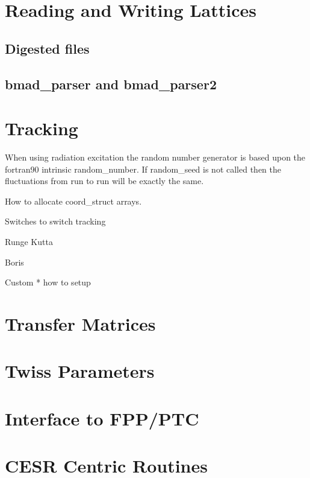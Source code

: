 \documentclass{book}
\begin{document}
\chapter{Reading and Writing Lattices}

\section{Digested files}

\section{bmad\_parser and bmad\_parser2}

\chapter{Tracking}

When using radiation excitation the random number generator is based
upon the fortran90 intrinsic random\_number. If random\_seed is not called
then the fluctuations from run to run will be exactly the same.


How to allocate coord\_struct arrays. 

  Switches to switch tracking

  Runge Kutta

  Boris

  Custom
    * how to setup



\chapter{Transfer Matrices}

\chapter{Twiss Parameters}

\chapter{Interface to FPP/PTC}

\chapter{CESR Centric Routines}
\end{document}
